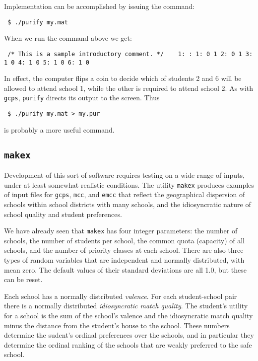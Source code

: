 \documentclass[12pt]{article}
\theoremstyle{definition}
\begin{document}
Implementation can be accomplished by issuing the command:
\begin{obeylines}
  \texttt{
    \$ ./purify my.mat 
    }
\end{obeylines}
\bigskip \noindent When we run the command above we get:
\begin{obeylines}\texttt{
/* This is a sample introductory comment. */
    \ \ \      1: \!\!\!\!:
   1:    0    1
   2:    0    1
   3:    1    0
   4:    1    0
   5:    1    0
   6:    1    0
}
\end{obeylines} \noindent
In effect, the computer flips a coin to decide which of students 2 and
6 will be allowed to attend school 1, while the other is required to
attend school 2.  As with \texttt{gcps}, \texttt{purify} directs its
output to the screen.  Thus
\begin{obeylines}
  \texttt{
    \$ ./purify my.mat > my.pur
    }
\end{obeylines}
\bigskip \noindent
is probably a more useful command.

\subsection{\texttt{makex}} \label{subsec:Makex}

Development of this sort of software requires testing on a wide range
of inputs, under at least somewhat realistic conditions.  The utility
\texttt{makex} produces examples of input files for \texttt{gcps},
\texttt{mcc}, and \texttt{emcc} that reflect the geographical
dispersion of schools within school districts with many schools, and
the idiosyncratic nature of school quality and student preferences.

We have already seen that \texttt{makex} has four integer parameters:
the number of schools, the number of students per school, the common
quota (capacity) of all schools, and the number of priority classes at
each school.  There are also three types of random variables that are
independent and normally distributed, with mean zero.  The default
values of their standard deviations are all 1.0, but these can be
reset.

Each school has a normally distributed \emph{valence}.  For each
student-school pair there is a normally distributed
\emph{idiosyncratic match quality}.  The student's utility for a
school is the sum of the school's valence and the idiosyncratic match
quality minus the distance from the student's house to the school.
These numbers determine the sudent's ordinal preferences over the
schools, and in particular they determine the ordinal ranking of the
schools that are weakly preferred to the safe school.
\end{document}
